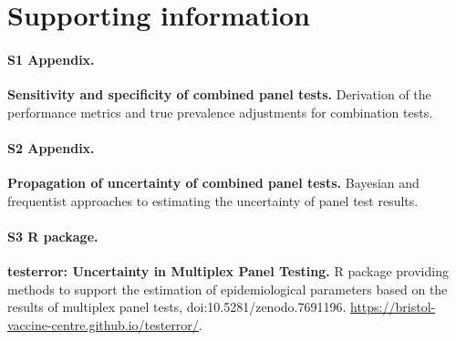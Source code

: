\documentclass[10pt,letterpaper]{article}
\begin{document}
\section*{Supporting information}


\paragraph*{S1 Appendix.}
\label{S1_Appendix}
{\bf Sensitivity and specificity of combined panel tests.} Derivation of the performance metrics and true prevalence adjustments for combination tests.

\paragraph*{S2 Appendix.}
\label{S2_Appendix}
{\bf Propagation of uncertainty of combined panel tests.} Bayesian and frequentist approaches to estimating the uncertainty of panel test results.

\paragraph*{S3 R package.}
\label{S3_Github}
{\bf testerror: Uncertainty in Multiplex Panel Testing.}  R package providing methods to support the estimation of epidemiological parameters based on the results of multiplex panel tests, doi:10.5281/zenodo.7691196. \url{https://bristol-vaccine-centre.github.io/testerror/}.
\end{document}
